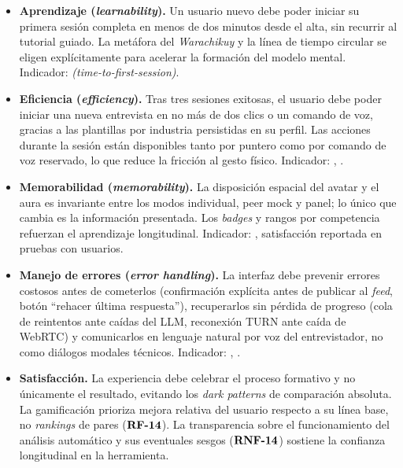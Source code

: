 \begin{itemize}
  \item \textbf{Aprendizaje (\textit{learnability}).} Un usuario nuevo
        debe poder iniciar su primera sesión completa en menos de dos
        minutos desde el alta, sin recurrir al tutorial guiado. La
        metáfora del \textit{Warachikuy} y la línea de tiempo circular se
        eligen explícitamente para acelerar la formación del modelo
        mental. Indicador:  \textit{(time-to-first-session)}.

  \item \textbf{Eficiencia (\textit{efficiency}).} Tras tres sesiones
        exitosas, el usuario debe poder iniciar una nueva entrevista en
        no más de dos clics o un comando de voz, gracias a las
        plantillas por industria persistidas en su perfil. Las acciones
        durante la sesión están disponibles tanto por puntero como por
        comando de voz reservado, lo que reduce la fricción al gesto
        físico. Indicador: , .

  \item \textbf{Memorabilidad (\textit{memorability}).} La disposición
        espacial del avatar y el aura es invariante entre los modos
        individual, peer mock y panel; lo único que cambia es la
        información presentada. Los \textit{badges} y rangos por
        competencia refuerzan el aprendizaje longitudinal. Indicador:
        , satisfacción reportada en pruebas con usuarios.

  \item \textbf{Manejo de errores (\textit{error handling}).} La
        interfaz debe prevenir errores costosos antes de cometerlos
        (confirmación explícita antes de publicar al \textit{feed},
        botón ``rehacer última respuesta''), recuperarlos sin pérdida
        de progreso (cola de reintentos ante caídas del LLM,
        reconexión TURN ante caída de WebRTC) y comunicarlos en
        lenguaje natural por voz del entrevistador, no como diálogos
        modales técnicos. Indicador: , .

  \item \textbf{Satisfacción.} La experiencia debe celebrar el proceso
        formativo y no únicamente el resultado, evitando los
        \textit{dark patterns} de comparación absoluta. La gamificación
        prioriza mejora relativa del usuario respecto a su línea base,
        no \textit{rankings} de pares ($\textbf{RF-14}$). La transparencia
        sobre el funcionamiento del análisis automático y sus
        eventuales sesgos ($\textbf{RNF-14}$) sostiene la confianza
        longitudinal en la herramienta.
\end{itemize}

